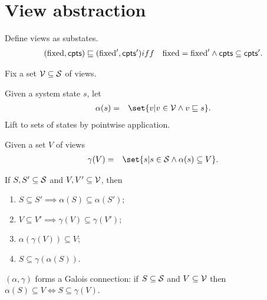 
\section{View abstraction}

Define views as substates.
\begin{eqnarray*}
(\fixed, \cpt ) \sqle (\fixed', \cpt') & iff & 
  \fixed = \fixed' \land \cpt \subseteq \cpt' .
\end{eqnarray*}


Fix a set $\V \subseteq \S$ of views.

Given a system state $s$, let
%
\begin{eqnarray*}
\alpha(s) & = &
  \set{ v | v \in \V \land v \sqle s}.
\end{eqnarray*}
%
Lift to sets of states by pointwise application. 

Given a set $V$ of views
\begin{eqnarray*}
\gamma(V) & = &   \set{ s | s \in \S \land \alpha(s) \subseteq V }.
\end{eqnarray*}



\begin{lemma}
If $S, S' \subseteq \S$ and $V, V' \subseteq \V$, then
\begin{enumerate}
\item $S \subseteq S' \implies \alpha(S) \subseteq \alpha(S')$;

\item $V \subseteq V' \implies \gamma(V) \subseteq \gamma(V')$;

\item $\alpha(\gamma(V)) \subseteq V$;

\item $S \subseteq \gamma(\alpha(S))$.
\end{enumerate}
\end{lemma}
%



\begin{lemma}
$(\alpha, \gamma)$ forms a Galois connection: if $S \subseteq \S$ and $V
  \subseteq \V$ then $\alpha(S) \subseteq V \iff S \subseteq \gamma(V)$.
\end{lemma}
%

